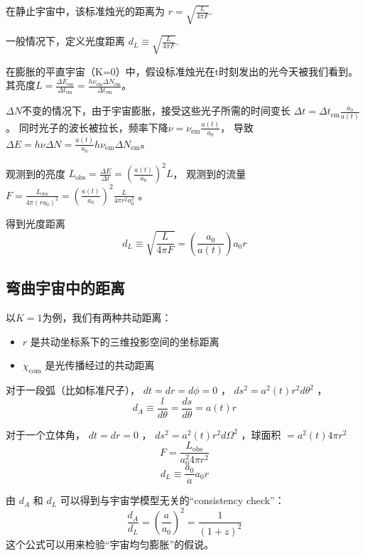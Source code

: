 \documentclass[]{ctexart}
\begin{document}
在静止宇宙中，该标准烛光的距离为 $r=\sqrt{\frac{L}{4\pi F}}$.

一般情况下，定义光度距离 $d_L \equiv \sqrt{\frac{L}{4\pi F}}$.

在膨胀的平直宇宙（K=0）中，假设标准烛光在t时刻发出的光今天被我们看到。
其亮度$L=\frac{\Delta E_\text{em}}{\Delta t_\text{em}} = \frac{h\nu_\text{em} \Delta N_\text{em}}{\Delta t_\text{em}}$。

$\Delta N$不变的情况下，由于宇宙膨胀，接受这些光子所需的时间变长 $\Delta t = \Delta t_\text{em}\frac{a_0}{a(t)}$。
同时光子的波长被拉长，频率下降$\nu=\nu_\text{em}\frac{a(t)}{a_0}$，
导致$\Delta E = h\nu\Delta N=\frac{a(t)}{a_0}h \nu_\text{em} \Delta N_\text{em}$。

观测到的亮度 $L_\text{obs}=\frac{\Delta E}{\Delta t}=\left(\frac{a(t)}{a_0}\right)^2 L$，
观测到的流量 $F=\frac{L_\text{obs}}{4\pi (ra_0)^2}=\left(\frac{a(t)}{a_0}\right)^2 \frac{L}{4\pi r^2 a_0^2}$ 。

得到光度距离
\begin{equation}
    d_L\equiv\sqrt{\frac{L}{4\pi F}}= \left(\frac{a_0}{a(t)}\right)a_0 r
\end{equation} 

\subsection{弯曲宇宙中的距离}

以$K=1$为例，我们有两种共动距离：
\begin{itemize}
    \item $r$ 是共动坐标系下的三维投影空间的坐标距离
    \item $\chi_\text{com}$ 是光传播经过的共动距离
\end{itemize}

对于一段弧（比如标准尺子）， $dt=dr=d\phi = 0$ ， $ds^2=a^2(t)r^2d\theta^2$ ，
\begin{equation}
    d_A\equiv \frac{l}{d\theta} = \frac{ds}{d\theta} = a(t)r
\end{equation}

对于一个立体角， $dt=dr=0$ ， $ds^2=a^2(t)r^2d\Omega^2$ ，球面积 $=a^2(t) 4\pi r^2$ 
\begin{equation}
    F = \frac{L_\text{obs}}{a_0^2 4\pi r^2}
\end{equation}
\begin{equation}
    d_L\equiv \frac{a_0}{a}a_0 r
\end{equation}

由 $d_A$ 和 $d_L$ 可以得到与宇宙学模型无关的“consistency check”：
\begin{equation}
    \frac{d_A}{d_L} = \left(\frac{a}{a_0}\right)^2 = \frac{1}{(1+z)^2}
\end{equation}  
这个公式可以用来检验“宇宙均匀膨胀”的假说。
\end{document}
